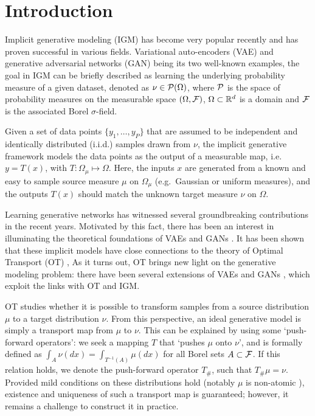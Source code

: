 
\section{Introduction}


Implicit generative modeling (IGM) \cite{diggle1984monte, mohamed2016learning} has become very popular recently and has proven
successful in various fields. Variational auto-encoders (VAE) \cite{kingma2013VAE} and generative adversarial networks (GAN) \cite{goodfellow2014generative} being its two well-known examples, the goal in IGM can be briefly described as learning the
underlying probability measure of a given dataset, denoted as $\nu \in {\cal P}(\Omega)$, where ${\cal P}$ is the space of probability measures on the measurable space $(\Omega,\mathcal{F})$, $\Omega \subset \mathbb{R}^d$ is a domain and $\mathcal{F}$ is the associated Borel $\sigma$-field. 

Given a set of data points $\{y_1 , \dots , y_P \}$ that are assumed to be independent and identically distributed (i.i.d.) samples drawn from $\nu$, the implicit generative framework models the data points as the output of a measurable map, i.e.\ $y = T(x)$, with $T: \Omega_\mu \mapsto \Omega$. Here, the inputs $x$ are generated from a known and easy to sample source measure $\mu$ on $\Omega_\mu$ (e.g.\ Gaussian or uniform measures), and the outputs $T(x)$ should match the unknown target measure $\nu$ on $\Omega$. 




Learning generative networks has witnessed several groundbreaking contributions in the recent years. Motivated by this fact, there has been an interest in illuminating the theoretical foundations of VAEs and GANs \cite{bousquet2017optimal,liu2017approximation}. 
%
It has been shown that these implicit models have close connections to the theory of Optimal Transport (OT) \cite{villani2008optimal}, 
%
As it turns out, OT brings new light on the generative modeling problem: there have been several extensions of VAEs \cite{tolstikhin2017wasserstein,kolouri2018sliced} and GANs \cite{arjovsky2017wasserstein,gulrajani2017improved,guo2017relaxed,lei2017geometric}, which exploit the links with OT and IGM. 


OT studies whether it is possible to transform samples from a source distribution $\mu$ to a target distribution $\nu$. From this perspective, an ideal generative model is simply a transport map from $\mu$ to $\nu$.  
This can be explained by using some `push-forward operators': we seek a mapping $T$ that `pushes $\mu$ onto $\nu$', and is formally defined as $\int_A \nu(dx) = \int_{T^{-1}(A)} \mu(dx) $ for all Borel sets $A \subset \mathcal{F}$. If this relation holds, we denote the push-forward operator $T_\#$, such that $T_\# \mu = \nu$. Provided mild conditions on these distributions hold (notably $\mu$ is non-atomic \cite{villani2008optimal}), existence and uniqueness of such a transport map is guaranteed; however, it remains a challenge to construct it in practice.

